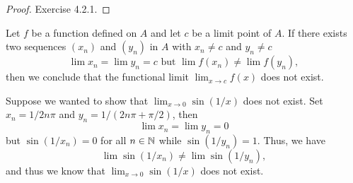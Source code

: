 \begin{proof}
Exercise 4.2.1.
\end{proof}


\begin{theorem}
    Let \( f \) be a function defined on \( A  \) and let \( c  \) be a limit point of \( A  \). If there exists two sequences \( (x_n) \) and \( (y_n) \) in \( A  \) with \( x_n \neq  c \) and \( y_n \neq c  \) 
    \[  \lim x_n = \lim y_n = c \text{~but~} \lim f(x_n) \neq \lim f(y_n),  \]
    then we conclude that the functional limit \( \lim_{x \to c } f(x)  \) does not exist.
    \end{theorem}

        Suppose we wanted to show that \( \lim_{ x \to 0 } \sin(1/x) \) does not exist. Set \( x_n = 1/2n\pi \) and \( y_n = 1 / (2n\pi + \pi/2 ) \), then 
        \[  \lim x_n = \lim y_n = 0  \] but
        \( \sin(1/x_n) = 0  \) for all \( n \in \mathbb{N}  \) while \( \sin(1/y_n) = 1  \). Thus, we have 
        \[  \lim \sin(1/x_n) \neq \lim  \sin (1/y_n), \]
        and thus we know that \( \lim_{x \to  0 } \sin(1/x)  \) does not exist.


